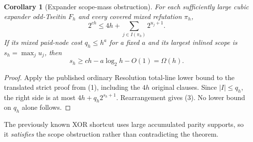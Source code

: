 \documentclass[11pt]{article}
\newtheorem{corollary}[theorem]{Corollary}
\begin{document}
\begin{corollary}[Expander scope-mass obstruction]
For each sufficiently large cubic expander odd-Tseitin $F_h$ and every covered mixed refutation $\pi_h$,
\[
\boxed{2^{ch}\le 4h+\sum_{j\in I(\pi_h)}2^{u_j+1}.}\tag{2}
\]
If its mixed paid-node cost $q_h\le h^a$ for a fixed $a$ and its largest inlined scope is $s_h=\max_ju_j$, then
\[
\boxed{s_h\ge ch-a\log_2h-O(1)=\Omega(h).}\tag{3}
\]
\end{corollary}
\begin{proof}
Apply the published ordinary Resolution total-line lower bound to the translated strict proof from (1), including the $4h$ original clauses. Since $|I|\le q_h$, the right side is at most $4h+q_h2^{s_h+1}$. Rearrangement gives (3). No lower bound on $q_h$ alone follows.
\end{proof}
The previously known XOR shortcut uses large accumulated parity supports, so it \emph{satisfies} the scope obstruction rather than contradicting the theorem.
\end{document}
